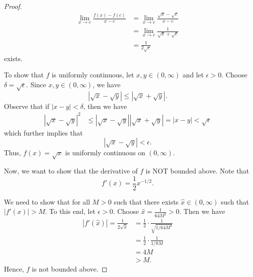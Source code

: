 \documentclass[a4paper]{article}
\begin{document}
\begin{proof}
        \begin{align*}
            \lim_{ x \to c } \frac{ f(x) - f(c) }{ x - c  } &= \lim_{ x \to c  }  \frac{ \sqrt{ x  }  - \sqrt{ c  }   }{  x - c  }  \\
                                                            &= \lim_{ x \to c }  \frac{ 1  }{  \sqrt{ x  }  + \sqrt{ c  }  }  \\
                                                            &= \frac{ 1 }{ 2 \sqrt{  c  }  }
        \end{align*}
        exists.

        To show that \( f  \) is uniformly continuous, let \( x,y \in (0,\infty )  \) and let \( \epsilon > 0  \). Choose \( \delta = \sqrt{ \epsilon }  \). Since \( x,y \in (0,\infty ) \), we have 
        \[  | \sqrt{ x }  - \sqrt{ y }  | \leq | \sqrt{ x }  + \sqrt{ y }  |.  \]
        Observe that if \( | x - y  |  < \delta \), then we have
        \begin{align*}
            | \sqrt{ x }  - \sqrt{ y }  |^{2} &\leq | \sqrt{ x } - \sqrt{ y }  |  | \sqrt{ x  }  + \sqrt{ y }  |   
                                              = | x - y  |
                                              < \sqrt{ \epsilon }
        \end{align*}
        which further implies that 
        \[  | \sqrt{ x } - \sqrt{ y }  |  < \epsilon. \]
        Thus, \( f(x) = \sqrt{ x }   \) is uniformly continuous on \( (0,\infty)  \).

        Now, we want to show that the derivative of \( f  \) is NOT bounded above. Note that 
        \[  f'(x) = \frac{ 1 }{ 2 }  x^{-1/2}. \]
        
        We need to show that for all \( M > 0  \) such that there exists \( \hat{x} \in (0,\infty ) \) such that \( | f'(x) |  > M  \). To this end, let \( \epsilon > 0  \). Choose \( \hat{x} = \frac{ 1 }{ 64 M^{2} } > 0   \). Then we have 
        \begin{align*}
            | f'(\hat{x}) | = \frac{ 1 }{ 2 \sqrt{ \hat{x} }  } &= \frac{ 1 }{ 2 }  \cdot \frac{ 1  }{  \sqrt{  1/64 M^{2} }  }  \\
                                                                &= \frac{ 1 }{ 2 } \cdot \frac{ 1 }{ 1/8M } \\ 
                                                                &= 4M \\
                                                                &> M. 
        \end{align*}
        Hence, \( f  \) is not bounded above.
\end{proof}
\end{document}
